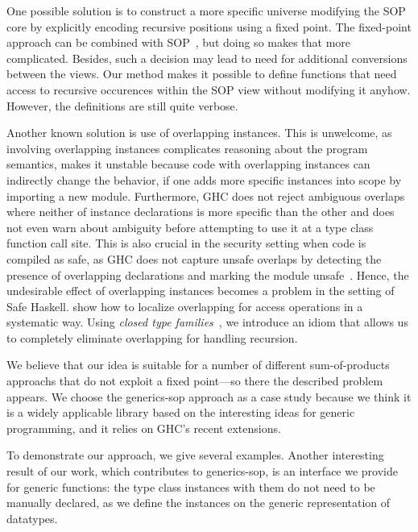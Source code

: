 \documentclass[sigplan,review,anonymous]{acmart}\settopmatter{printfolios=true,printccs=false,printacmref=false}
\begin{document}
One possible solution is to construct a more specific universe modifying the SOP core by explicitly encoding recursive positions using a fixed point. The fixed-point approach can be combined with SOP~\citep{VriLoeh2014}, but doing so makes that more complicated. Besides, such a decision may lead to need for additional conversions between the views. Our method makes it possible to define functions that need access to recursive occurences within the SOP view without modifying it anyhow. However, the definitions are still quite verbose.

Another known solution is use of overlapping instances. This is unwelcome, as involving overlapping instances complicates reasoning about the program semantics, makes it unstable because code with overlapping instances can indirectly change the behavior, if one adds more specific instances into scope by importing a new module. Furthermore, GHC does not reject ambiguous overlaps where neither of instance declarations is more specific than the other and does not even warn about ambiguity before attempting to use it at a type class function call site. This is also crucial in the security setting when code is compiled as safe, as GHC does not capture unsafe overlaps by detecting the presence of overlapping declarations and marking the module unsafe~\citep{sh-overlapping}. Hence, the undesirable effect of overlapping instances becomes a problem in the setting of Safe Haskell. \citet{Kiselyov2004} show how to localize overlapping for access operations in a systematic way. Using \textit{closed type families}~\citep{Eisenberg2014}, we introduce an idiom that allows us to completely eliminate overlapping for handling recursion.

We believe that our idea is suitable for a number of different sum-of-products approachs that do not exploit a fixed point---so there the described problem appears. We choose the \textsf{generics-sop} approach as a case study because we think it is a widely applicable library based on the interesting ideas for generic programming, and it relies on GHC's recent extensions.

To demonstrate our approach, we give several examples. Another interesting result of our work, which contributes to \textsf{generics-sop}, is an interface we provide for generic functions: the type class instances with them do not need to be manually declared, as we define the instances on the generic representation of datatypes.
\end{document}
